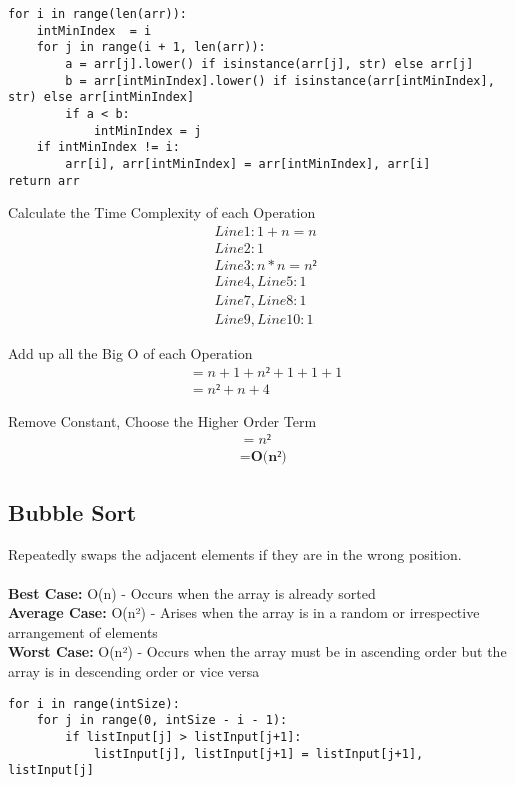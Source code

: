 \documentclass{article}
\begin{document}
\begin{verbatim}
for i in range(len(arr)):               
    intMinIndex  = i                    
    for j in range(i + 1, len(arr)):    
        a = arr[j].lower() if isinstance(arr[j], str) else arr[j]
        b = arr[intMinIndex].lower() if isinstance(arr[intMinIndex], str) else arr[intMinIndex]
        if a < b:
            intMinIndex = j
    if intMinIndex != i:
        arr[i], arr[intMinIndex] = arr[intMinIndex], arr[i]
return arr
\end{verbatim}

Calculate the Time Complexity of each Operation
\begin{align*}
    &\text{} Line 1:  1 + n = n  \\
    &\text{} Line 2: 1  \\
    &\text{} Line 3: n * n = n² \\
    &\text{} Line 4, Line 5:  1 \\
    &\text{} Line 7, Line 8: 1 \\
    &\text{} Line 9, Line 10: 1 
\end{align*}

Add up all the Big O of each Operation
\begin{align*}
    &\text{} = n + 1 + n² + 1 + 1 + 1   \\
    &\text{} = n² + n + 4 
\end{align*}

Remove Constant, Choose the Higher Order Term
\begin{align*}
    &\text{} = n² \\
    &\text{} = \textbf{O(n²) }
\end{align*}


\subsection{Bubble Sort}
Repeatedly swaps the adjacent elements if they are in the wrong position.\\
\\
\textbf{Best Case:} O(n) - Occurs when the array is already sorted\\
\textbf{Average Case:} O(n²) - Arises when the array is in a random or irrespective arrangement of elements\\
\textbf{Worst Case:} O(n²) - Occurs when the array must be in ascending order but the array is in descending order or vice versa\\

\begin{verbatim}
for i in range(intSize): 
    for j in range(0, intSize - i - 1):
        if listInput[j] > listInput[j+1]:
            listInput[j], listInput[j+1] = listInput[j+1], listInput[j]
\end{verbatim}
\end{document}
